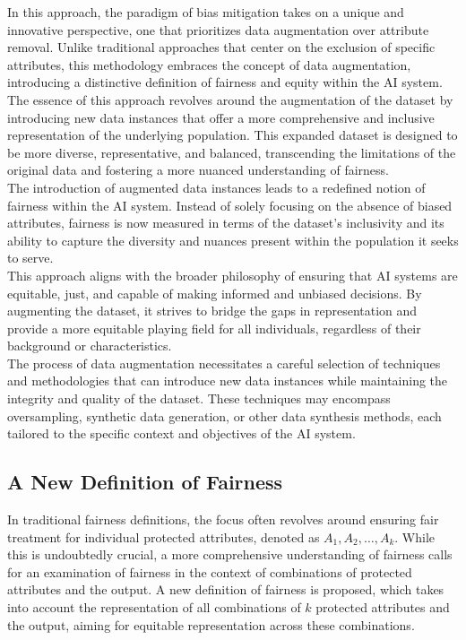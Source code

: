 \documentclass[12pt,a4paper,openright,twoside]{book}
\begin{document}
In this approach, the paradigm of bias mitigation takes on a unique and innovative perspective, one that prioritizes data augmentation over attribute removal. Unlike traditional approaches that center on the exclusion of specific attributes, this methodology embraces the concept of data augmentation, introducing a distinctive definition of fairness and equity within the AI system.\\
The essence of this approach revolves around the augmentation of the dataset by introducing new data instances that offer a more comprehensive and inclusive representation of the underlying population. This expanded dataset is designed to be more diverse, representative, and balanced, transcending the limitations of the original data and fostering a more nuanced understanding of fairness. \\
The introduction of augmented data instances leads to a redefined notion of fairness within the AI system. Instead of solely focusing on the absence of biased attributes, fairness is now measured in terms of the dataset's inclusivity and its ability to capture the diversity and nuances present within the population it seeks to serve. \\
This approach aligns with the broader philosophy of ensuring that AI systems are equitable, just, and capable of making informed and unbiased decisions. By augmenting the dataset, it strives to bridge the gaps in representation and provide a more equitable playing field for all individuals, regardless of their background or characteristics. \\
The process of data augmentation necessitates a careful selection of techniques and methodologies that can introduce new data instances while maintaining the integrity and quality of the dataset. These techniques may encompass oversampling, synthetic data generation, or other data synthesis methods, each tailored to the specific context and objectives of the AI system.

\subsection{A New Definition of Fairness}

In traditional fairness definitions, the focus often revolves around ensuring fair treatment for individual protected attributes, denoted as $A_1, A_2, \ldots, A_k$. While this is undoubtedly crucial, a more comprehensive understanding of fairness calls for an examination of fairness in the context of combinations of protected attributes and the output. A new definition of fairness is proposed, which takes into account the representation of all combinations of $k$ protected attributes and the output, aiming for equitable representation across these combinations.
\end{document}
